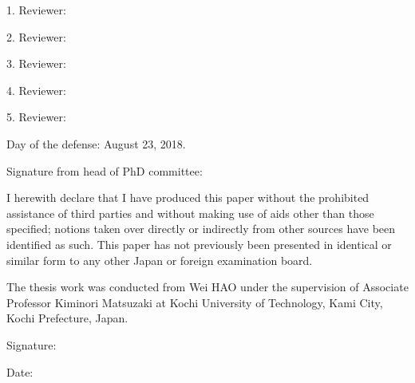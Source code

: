 
\newpage
\vspace{10mm}
1. Reviewer: 

\vspace{10mm}
2. Reviewer:

\vspace{10mm}
3. Reviewer:

\vspace{10mm}
4. Reviewer:

\vspace{10mm}
5. Reviewer:


\vspace{40mm}
Day of the defense: August 23, 2018.

\vspace{20mm}\hspace{70mm}

Signature from head of PhD committee:


\newpage

\begin{declaration}
	
	I herewith declare that I have produced this paper without the prohibited
	assistance of third parties and without making use of aids other than those
	specified; notions taken over directly or indirectly from other sources have
	been identified as such. This paper has not previously been presented in
	identical or similar form to any other Japan or foreign examination board.
	
	The thesis work was conducted from Wei HAO under the supervision of Associate
	Professor Kiminori Matsuzaki at Kochi University of Technology, Kami City, Kochi
	Prefecture, Japan.
	
	\vspace{70mm}
	
	\hspace{80mm} Signature:
	
	\hspace{80mm} Date:
	
\end{declaration} 


